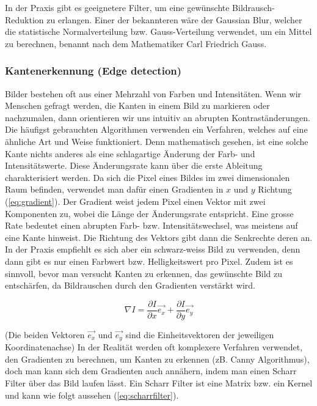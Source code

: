 In der Praxis gibt es geeignetere Filter, um eine gewünschte Bildrausch-Reduktion zu erlangen. Einer der bekannteren wäre der Gaussian Blur, welcher die statistische Normalverteilung bzw. Gauss-Verteilung verwendet, um ein Mittel zu berechnen, benannt nach dem Mathematiker Carl Friedrich Gauss. \cite{carlfriedrichgauss:1}

\subsubsection{Kantenerkennung (Edge detection)}
\label{subsec:kanntenerkennung}

Bilder bestehen oft aus einer Mehrzahl von Farben und Intensitäten. Wenn wir Menschen gefragt werden, die Kanten in einem Bild zu markieren oder nachzumalen, dann orientieren wir uns intuitiv an abrupten Kontraständerungen. Die häufigst gebrauchten Algorithmen verwenden ein Verfahren, welches auf eine ähnliche Art und Weise funktioniert. Denn mathematisch gesehen, ist eine solche Kante nichts anderes als eine schlagartige Änderung der Farb- und Intensitätswerte. Diese Änderungsrate kann über die erste Ableitung charakterisiert werden. Da sich die Pixel eines Bildes im zwei dimensionalen Raum befinden, verwendet man dafür einen Gradienten in $x$ und $y$ Richtung (\ref{eq:gradient}). Der Gradient weist jedem Pixel einen Vektor mit zwei Komponenten zu, wobei die Länge der Änderungsrate entspricht. Eine grosse Rate bedeutet einen abrupten Farb- bzw. Intensitätswechsel, was meistens auf eine Kante hinweist. Die Richtung des Vektors gibt dann die Senkrechte deren an. In der Praxis empfiehlt es sich aber ein schwarz-weiss Bild zu verwenden, denn dann gibt es nur einen Farbwert bzw. Helligkeitswert pro Pixel. Zudem ist es sinnvoll, bevor man versucht Kanten zu erkennen, das gewünschte Bild zu entschärfen, da Bildrauschen durch den Gradienten verstärkt wird. \cite{computervision_szeliski:2}

\begin{equation}
	\nabla I = \frac{\partial I}{\partial x} \vec{e_{x}} + \frac{\partial I}{\partial y} \vec{e_{y}}
	\label{eq:gradient}
\end{equation}
\cite{computervision_szeliski:2}

(Die beiden Vektoren $\vec{e_x}$ und $\vec{e_y}$ sind die Einheitsvektoren der jeweiligen Koordinatenachse) In der Realität werden oft komplexere Verfahren verwendet, den Gradienten zu berechnen, um Kanten zu erkennen (zB. Canny Algorithmus), doch man kann sich dem Gradienten auch annähern, indem man einen Scharr Filter über das Bild laufen lässt. Ein Scharr Filter ist eine Matrix bzw. ein Kernel und kann wie folgt aussehen (\ref{eq:scharrfilter}). \cite{computervision_szeliski:2}

